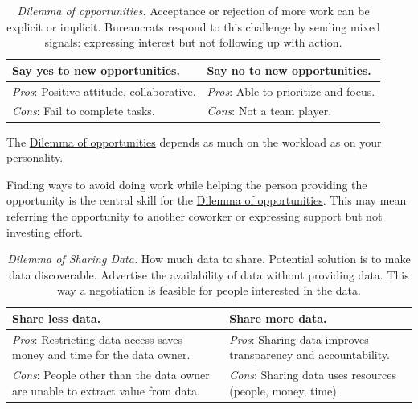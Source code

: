 \begin{center}
\begin{table}[H] %
\begin{tabular}{ | m{\dilemmatablewidth}| m{\dilemmatablewidth} | } 
  \hline
  \textbf{Say yes to new opportunities.} & 
  \textbf{Say no to new opportunities.} \\ 
  \hline
  \textit{Pros}: Positive attitude, collaborative. &
  \textit{Pros}: Able to prioritize and focus. \\
  \hline
  \textit{Cons}: Fail to complete tasks. &
  \textit{Cons}: Not a team player. \\  
  \hline
\end{tabular}
\caption{
\textit{Dilemma of opportunities.}
Acceptance or rejection of more work can be explicit or implicit. Bureaucrats respond to this challenge by sending mixed signals: expressing interest but not following up with action.
}
\label{table:new-opportunties}
\end{table}
\end{center}

The \href{table:new-opportunties}{Dilemma of opportunities} depends as much on the workload as on your personality. 

Finding ways to avoid doing work while helping the person providing the opportunity is the central skill for the \href{table:new-opportunties}{Dilemma of opportunities}. This may mean referring the opportunity to another coworker or expressing support but not investing effort. 



\begin{center}
\begin{table}[H] %
\begin{tabular}{ | m{\dilemmatablewidth}| m{\dilemmatablewidth} | } 
  \hline
  \textbf{Share less data.} &
  \textbf{Share more data.} \\
  \hline
  \textit{Pros}: Restricting data access saves money and time for the data owner.&
  \textit{Pros}: Sharing data improves transparency and accountability. \\
  \hline
  \textit{Cons}: People other than the data owner are unable to extract value from data. & 
  \textit{Cons}: Sharing data uses resources (people, money, time). \\
  \hline
\end{tabular}
\caption{
\textit{Dilemma of Sharing Data.}
How much data to share. Potential solution is to make data discoverable. Advertise the availability of data without providing data. This way a negotiation is feasible for people interested in the data.
}
\label{table:data-share-vs-hide}
\end{table}
\end{center}

